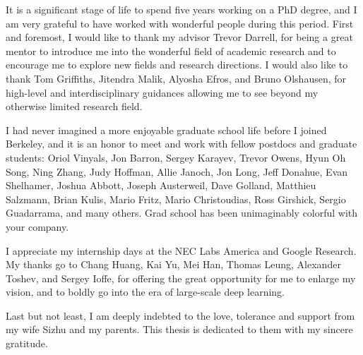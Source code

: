 \begin{acknowledgements}

It is a significant stage of life to spend five years working on a PhD degree, and I am very grateful to have worked with wonderful people during this period. First and foremost, I would like to thank my advisor Trevor Darrell, for being a great mentor to introduce me into the wonderful field of academic research and to encourage me to explore new fields and research directions. I would also like to thank Tom Griffiths, Jitendra Malik, Alyosha Efros, and Bruno Olshausen, for high-level and interdisciplinary guidances allowing me to see beyond my otherwise limited research field.

I had never imagined a more enjoyable graduate school life before I joined Berkeley, and it is an honor to meet and work with fellow postdocs and graduate students: Oriol Vinyals, Jon Barron, Sergey Karayev, Trevor Owens, Hyun Oh Song, Ning Zhang, Judy Hoffman, Allie Janoch, Jon Long, Jeff Donahue, Evan Shelhamer, Joshua Abbott, Joseph Austerweil, Dave Golland, Matthieu Salzmann, Brian Kulis, Mario Fritz, Mario Christoudias, Ross Girshick, Sergio Guadarrama, and many others. Grad school has been unimaginably colorful with your company.

I appreciate my internship days at the NEC Labs America and Google Research. My thanks go to Chang Huang, Kai Yu, Mei Han, Thomas Leung, Alexander Toshev, and Sergey Ioffe, for offering the great opportunity for me to enlarge my vision, and to boldly go into the era of large-scale deep learning.

Last but not least, I am deeply indebted to the love, tolerance and support from my wife Sizhu and my parents. This thesis is dedicated to them with my sincere gratitude.

\end{acknowledgements}
